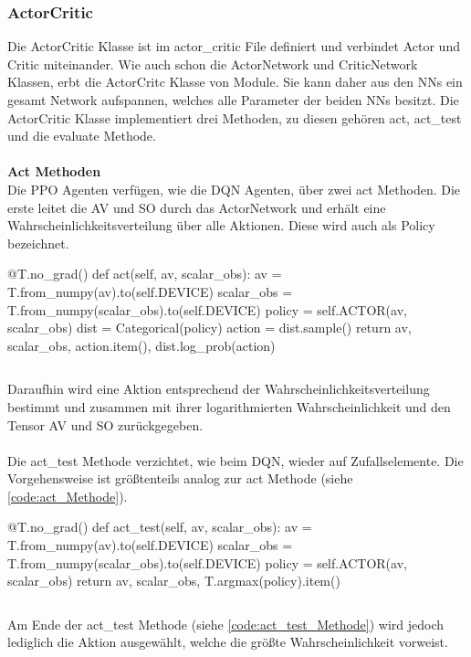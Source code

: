 \subsubsection{ActorCritic} \label{sec:Implementierung_ActorCritic}
Die ActorCritic Klasse ist im actor\_critic File definiert und verbindet Actor und Critic miteinander.
Wie auch schon die ActorNetwork und CriticNetwork Klassen, erbt die ActorCritc Klasse von Module. Sie kann daher aus den NNs ein gesamt Network aufspannen, welches alle Parameter der beiden NNs besitzt.
Die ActorCritic Klasse implementiert drei Methoden, zu diesen gehören act, act\_test und die evaluate Methode.\\
\\\textbf{Act Methoden} \label{Implementierung_act_PPO}\\
Die PPO Agenten verfügen, wie die DQN Agenten, über zwei act Methoden. Die erste leitet die AV und SO durch das ActorNetwork und erhält eine Wahrscheinlichkeitsverteilung über alle Aktionen. Diese wird auch als Policy bezeichnet.
\begin{python}
@T.no_grad()
def act(self, av, scalar_obs):
	av = T.from_numpy(av).to(self.DEVICE)
	scalar_obs = T.from_numpy(scalar_obs).to(self.DEVICE)
	policy = self.ACTOR(av, scalar_obs)
	dist = Categorical(policy)
	action = dist.sample()
	return av, scalar_obs, action.item(), dist.log_prob(action)
\end{python}
\begin{lstlisting}[caption=Darstellung der act Methode, label=code:act_Methode]
\end{lstlisting}
Daraufhin wird eine Aktion entsprechend der Wahrscheinlichkeitsverteilung bestimmt und zusammen mit ihrer logarithmierten Wahrscheinlichkeit und den Tensor AV und SO zurückgegeben.\\
\\Die act\_test Methode verzichtet, wie beim DQN, wieder auf Zufallselemente. 
Die Vorgehensweise ist größtenteils analog zur act Methode (siehe \ref{code:act_Methode}).
\begin{python}
@T.no_grad()
def act_test(self, av, scalar_obs):
	av = T.from_numpy(av).to(self.DEVICE)
	scalar_obs = T.from_numpy(scalar_obs).to(self.DEVICE)
	policy = self.ACTOR(av, scalar_obs)
	return av, scalar_obs, T.argmax(policy).item()
\end{python}
\begin{lstlisting}[caption=Darstellung der act\_test Methode, label=code:act_test_Methode]
\end{lstlisting}
Am Ende der act\_test Methode (siehe \ref{code:act_test_Methode}) wird jedoch lediglich die Aktion ausgewählt, welche die größte Wahrscheinlichkeit vorweist.\\
